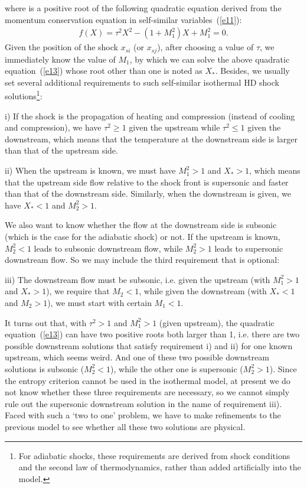 \documentclass[fleqn,usenatbib]{mnras}
\begin{document}
where is a positive root of the following quadratic equation derived from the momentum conservation equation in self-similar variables~(\ref{e11}):
\begin{gather}
f(X)=\tau^{2} X^{2}
 -(1+M_{1}^{2}) X+M_{1}^{2}=0. \label{e13}
\end{gather}
Given the position of the shock $x_{si}$ (or $x_{sj}$), after choosing a value of $\tau$, we immediately know the value of $M_{1}$, by which we can solve the above quadratic equation~(\ref{e13}) whose root other than one is noted as $X_{*}$. Besides, we usually set several additional requirements to such self-similar isothermal HD shock solutions\footnote{For adiabatic shocks, these requirements are derived from shock conditions and the second law of thermodynamics, rather than added artificially into the model.}: 

i) If the shock is the propagation of heating and compression (instead of cooling and compression), we have $\tau^{2}\geq 1$ given the upstream while $\tau^{2}\leq 1$ given the downstream, which means that the temperature at the downstream side is larger than that of the upstream side.

ii) When the upstream is known, we must have $M_{1}^{2}>1$ and $X_{*}>1$, which means that the upstream side flow relative to the shock front is supersonic and faster than that of the downstream side. Similarly, when the downstream is given, we have $X_{*}<1$ and $M_{2}^{2}>1$.

We also want to know whether the flow at the downstream side is subsonic (which is the case for the adiabatic shock) or not. If the upstream is known, $M_{2}^{2}<1$ leads to subsonic downstream flow, while $M_{2}^{2}>1$ leads to supersonic downstream flow. So we may include the third requirement that is optional:

iii) The downstream flow must be subsonic, i.e. given the upstream (with $M_{1}^{2}>1$ and $X_{*}>1$), we require that $M_{2}<1$, while given the downstream (with $X_{*}<1$ and $M_{2}>1$), we must start with certain $M_{1}<1$.

It turns out that, with $\tau^{2}>1$ and $M_{1}^{2}>1$ (given upstream), the quadratic equation~(\ref{e13}) can have two positive roots both larger than 1, i.e. there are two possible downstream solutions that satisfy requirement i) and ii) for one known upstream, which seems weird. And one of these two possible downstream solutions is subsonic ($M_{2}^{2}<1$), while the other one is supersonic ($M_{2}^{2}>1$). Since the entropy criterion cannot be used in the isothermal model, at present we do not know whether these three requirements are necessary, so we cannot simply rule out the supersonic downstream solution in the name of requirement iii). Faced with such a `two to one' problem, we have to make refinements to the previous model to see whether all these two solutions are physical. 
\end{document}
